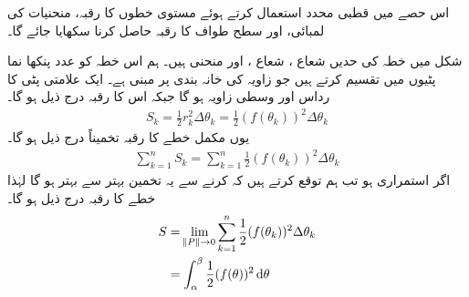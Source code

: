 



اس حصے  میں قطبی محدد استعمال کرتے ہوئے مستوی خطوں کا رقبہ، منحنیات کی لمبائی، اور سطح طواف کا رقبہ حاصل کرنا سکھایا جائے گا۔

شکل  میں خطہ  کی حدیں  شعاع ، شعاع ،  اور منحنی  ہیں۔  ہم اس خطہ کو  عدد پنکھا نما پٹیوں میں تقسیم کرتے ہیں جو زاویہ  کی خانہ بندی  پر مبنی ہے۔ ایک علامتی پٹی کا رداس  اور وسطی زاویہ  ہو گا جبکہ اس کا رقبہ درج ذیل ہو گا۔
\begin{align*}
S_k=\frac{1}{2}r_k^2\Delta \theta_k=\frac{1}{2}(f(\theta_k))^2\Delta \theta_k
\end{align*}
یوں مکمل خطے کا رقبہ تخمیناً درج ذیل ہو گا۔
\begin{align*}
\sum_{k=1}^{n}S_k=\sum_{k=1}^{n}\frac{1}{2}(f(\theta_k))^2\Delta \theta_k
\end{align*}
اگر  استمراری ہو تب ہم توقع کرتے ہیں کہ  کرنے سے یہ تخمین بہتر سے بہتر ہو گا لہٰذا خطے کا رقبہ درج ذیل ہو گا۔
\begin{align*}
S&=\lim_{\norm{P}\to 0}\sum_{k=1}^{n}\frac{1}{2}(f(\theta_k))^2\Delta\theta_k\\
&=\int_{\alpha}^{\beta}\frac{1}{2}(f(\theta))^2\dif\theta
\end{align*}
%
